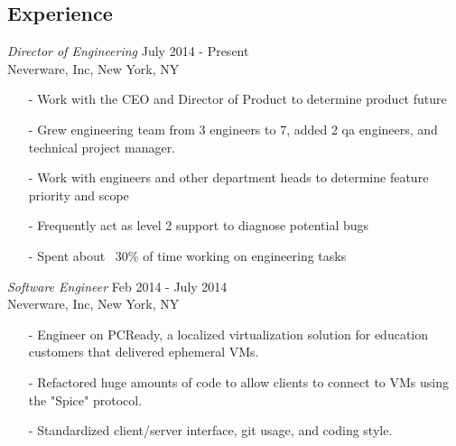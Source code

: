 \documentclass[margin, 10pt]{res} %
\begin{document}
\begin{resume}
 
\section{Experience}

{\sl Director of Engineering} \hfill July 2014 - Present \\
Neverware, Inc, New York, NY
\begin{itemize} \itemsep -2pt
\item[-] Work with the CEO and Director of Product to determine product future
\item[-] Grew engineering team from 3 engineers to 7, added 2 qa engineers, and technical project manager.
\item[-] Work with engineers and other department heads to determine feature
priority and scope
\item[-] Frequently act as level 2 support to diagnose potential bugs
\item[-] Spent about ~30\% of time working on engineering tasks
\end{itemize}

{\sl Software Engineer} \hfill Feb 2014 - July 2014 \\
Neverware, Inc, New York, NY
\begin{itemize} \itemsep -2pt
\item[-] Engineer on PCReady, a localized virtualization solution for education customers that delivered ephemeral VMs.
\item[-] Refactored huge amounts of code to allow clients to connect to VMs using the "Spice" protocol.
\item[-] Standardized client/server interface, git usage, and coding style.
\end{itemize}


\end{resume}
\end{document}
